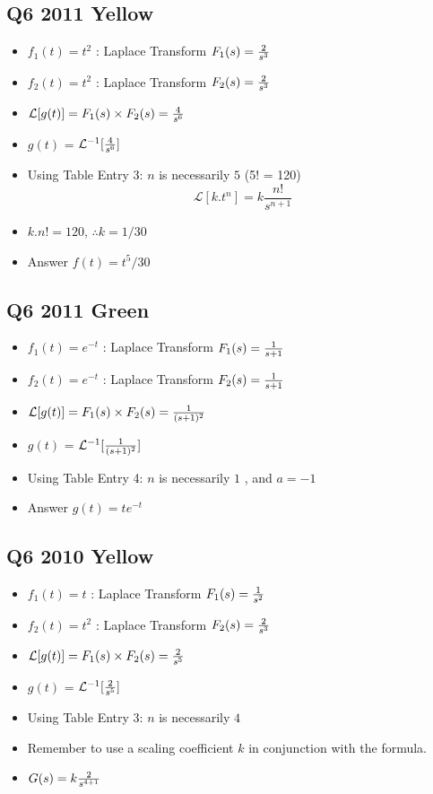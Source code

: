 \documentclass[11pt,a4paper,titlepage,oneside,openany]{article}
\numberwithin{equation}{section}
\numberwithin{algorithm}{section}
\numberwithin{figure}{section}
\numberwithin{table}{section}
\begin{document}
\subsection*{Q6 2011 Yellow}
\begin{itemize}
\item $f_1(t)=t^2$ : Laplace Transform $F_1(s)={2 \over s^3}$
\item $f_2(t)=t^2$ : Laplace Transform $F_2(s)={2 \over s^3}$
\item $\mathcal{L}[g(t)] = F_1(s)\times F_2(s) = {4 \over s^6}$
\item $g(t)$ = $\mathcal{L}^{-1}[{4 \over s^6}]$
\item Using Table Entry 3: $n$ is necessarily $5$ (5! = 120)
\[ \mathcal{L}[k.t^n] = k\frac{n!}{s^{n+1}} \]
\item $k.n! = 120$, $\therefore k=1/30$
\item Answer $f(t) = t^5/30$
\end{itemize}

\subsection*{Q6 2011 Green}
\begin{itemize}
\item $f_1(t)=e^{-t}$ : Laplace Transform $F_1(s)={1 \over s+1}$
\item $f_2(t)=e^{-t}$ : Laplace Transform $F_2(s)={1 \over s+1}$
\item $\mathcal{L}[g(t)] = F_1(s)\times F_2(s) = {1 \over (s+1)^2}$
\item $g(t)$ = $\mathcal{L}^{-1}[{1 \over (s+1)^2}]$
\item Using Table Entry 4: $n$ is necessarily $1$ , and $a=-1$
\item Answer $g(t) = te^{-t}$
\end{itemize}

\subsection*{Q6 2010 Yellow}

\begin{itemize}
\item $f_1(t)=t$ : Laplace Transform $F_1(s)={1 \over s^2}$
\item $f_2(t)=t^2$ : Laplace Transform $F_2(s)={2 \over s^3}$
\item $\mathcal{L}[g(t)] = F_1(s)\times F_2(s) = {2 \over s^5}$
\item $g(t)$ = $\mathcal{L}^{-1}[{2 \over s^5}]$
\item Using Table Entry 3: $n$ is necessarily $4$
\item Remember to use a scaling coefficient $k$ in conjunction with the formula.
\item $G(s) = k { 2 \over s^{4+1}}$
\end{itemize}
\end{document}
